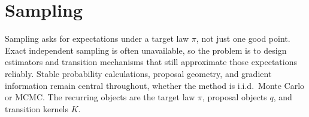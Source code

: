 \section{Sampling}
\label{sec:sampling}

Sampling asks for expectations under a target law \(\pi\), not just one good point.
Exact independent sampling is often unavailable, so the problem is to design estimators and transition mechanisms that still approximate those expectations reliably.
Stable probability calculations, proposal geometry, and gradient information remain central throughout, whether the method is i.i.d.\ Monte Carlo or MCMC.
The recurring objects are the target law \(\pi\), proposal objects \(q\), and transition kernels \(K\).




